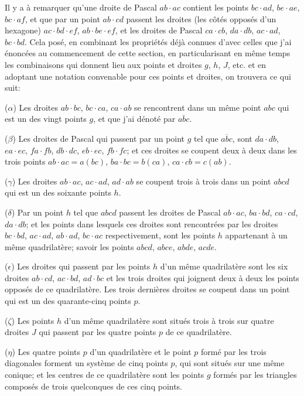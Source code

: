 \documentclass[11pt,a4paper]{book}
\begin{document}
Il y a \`{a} remarquer qu'une droite de Pascal $ab \cdot ac$ contient les points $bc \cdot ad$, $be \cdot ae$, $bc \cdot af$, et que par un point $ab \cdot cd$ passent les droites (les c\^{o}t\'{e}s oppos\'{e}s d'un hexagone) $ac \cdot bd \cdot ef$, $ab \cdot be \cdot ef$, et les droites de Pascal $ca \cdot cb$, $da \cdot db$, $ac \cdot ad$, $bc \cdot bd$. Cela pos\'{e}, en combinant les propri\'{e}t\'{e}s d\'{e}j\`{a} connues d'avec celles que j'ai \'{e}nonc\'{e}es au commencement de cette section, en particularisant en m\^{e}me temps les combinaisons qui donnent lieu aux points et droites $g$, $h$, $J$, etc. et en adoptant une notation convenable pour ces points et droites, on trouvera ce qui suit:

($\alpha$) Les droites $ab \cdot bc$, $bc \cdot ca$, $ca \cdot ab$ se rencontrent dans un m\^{e}me point $abc$ qui est un des vingt points $g$, et que j'ai d\'{e}not\'{e} par $\overline{abc}$.

($\beta$) Les droites de Pascal qui passent par un point $g$ tel que $\overline{abc}$, sont $da \cdot db$, $ea \cdot ec$, $fa \cdot fb$, $db \cdot dc$, $eb \cdot ec$, $fb \cdot fc$; et ces droites se coupent deux \`{a} deux dans les trois points $ab \cdot ac = a(bc)$, $ba \cdot bc = b(ca)$, $ca \cdot cb = c(ab)$.

($\gamma$) Les droites $ab \cdot ac$, $ac \cdot ad$, $ad \cdot ab$ se coupent trois \`{a} trois dans un point $abcd$ qui est un des soixante points $h$.

($\delta$) Par un point $h$ tel que $abcd$ passent les droites de Pascal $ab \cdot ac$, $ba \cdot bd$, $ca \cdot cd$, $da \cdot db$; et les points dans lesquels ces droites sont rencontr\'{e}es par les droites $bc \cdot bd$, $ac \cdot ad$, $ab \cdot ad$, $bc \cdot ac$ respectivement, sont les points $h$ appartenant \`{a} un m\^{e}me quadrilat\`{e}re; savoir les points $abcd$, $abce$, $abde$, $acde$.

($\epsilon$) Les droites qui passent par les points $h$ d'un m\^{e}me quadrilat\`{e}re sont les six droites $ab \cdot cd$, $ac \cdot bd$, $ad \cdot bc$ et les trois droites qui joignent deux \`{a} deux les points oppos\'{e}s de ce quadrilat\`{e}re. Les trois derni\`{e}res droites se coupent dans un point qui est un des quarante-cinq points $p$.

($\zeta$) Les points $h$ d'un m\^{e}me quadrilat\`{e}re sont situ\'{e}s trois \`{a} trois sur quatre droites $J$ qui passent par les quatre points $p$ de ce quadrilat\`{e}re.

($\eta$) Les quatre points $p$ d'un quadrilat\`{e}re et le point $p$ form\'{e} par les trois diagonales forment un syst\`{e}me de cinq points $p$, qui sont situ\'{e}s sur une m\^{e}me conique; et les centres de ce quadrilat\`{e}re sont les points $g$ form\'{e}s par les triangles compos\'{e}s de trois quelconques de ces cinq points.
\end{document}

